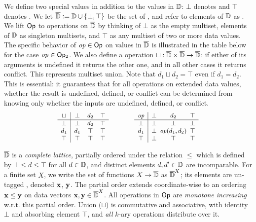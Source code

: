 We define two special values in addition to
the values in $\mathbb{D}$: $\bot$ denotes 
and $\top$ denotes .
We let $\overline{\mathbb{D}{}} := \mathbb{D} \cup \{\bot, \top\}$ be the set of ,
and refer to elements of $\mathbb{D}$ as .
We lift $\textsf{Op}$ to operations on $\overline{\mathbb{D}{}}$ by thinking of $\bot$ as the empty multiset,
elements of $\mathbb{D}$ as singleton multisets, and $\top$ as any multiset of two or more data values.
The specific behavior of $\mathit{op} \in \textsf{Op}$ on values in $\overline{\mathbb{D}{}}$
is illustrated in the table below
for the case $\mathit{op} \in \textsf{Op}{}_2$.
We also define a  operation $\sqcup: \overline{\mathbb{D}{}} \times \overline{\mathbb{D}{}} \to \overline{\mathbb{D}{}}$:
if either of its arguments is undefined it returns the other one,
and in all other cases it returns conflict.
This represents multiset union. Note that $d_1 \sqcup d_2 = \top$ even if $d_1 = d_2$.
This is essential: it guarantees that for all operations on extended data values, whether the result is undefined, defined, or conflict can be determined from knowing only whether the inputs are undefined, defined, or conflict.
\[
\small
\begin{array}{c|ccc}
\sqcup & \bot & d_2 & \top \\
\hline
\bot & \bot & d_2 & \top \\
d_1 & d_1 & \top & \top \\
\top & \top & \top & \top
\end{array}
\qquad \qquad
\begin{array}{c|ccc}
\mathit{op} & \bot & d_2 & \top \\
\hline
\bot & \bot & \bot & \bot \\
d_1 & \bot & \hspace{-5pt}\mathit{op}(d_1,d_2)\hspace{-5pt} & \top \\
\top & \bot & \top & \top
\end{array}
\]

$\overline{\mathbb{D}{}}$ is a \emph{complete lattice}, partially ordered under the
relation $\le$ which is defined by $\bot \le d \le \top$ for all $d \in \mathbb{D}$,
and distinct elements $d, d' \in \mathbb{D}$ are incomparable.
For a finite set $X$, we write the set of functions $X \to \overline{\mathbb{D}{}}$ as $\overline{\mathbb{D}{}}^X$; its elements are un-tagged , denoted $\textbf{x}$, $\textbf{y}$.
The partial order extends coordinate-wise to an ordering $\textbf{x} \le \textbf{y}$ on data vectors $\textbf{x}, \textbf{y} \in \overline{\mathbb{D}{}}^X$.
All operations in $\textsf{Op}{}$ are \emph{monotone increasing}
w.r.t. this partial order.
Union ($\sqcup$) is commutative and associative, with identity $\bot$ and absorbing element $\top$,
and \emph{all} $k$-ary operations distribute over it.

